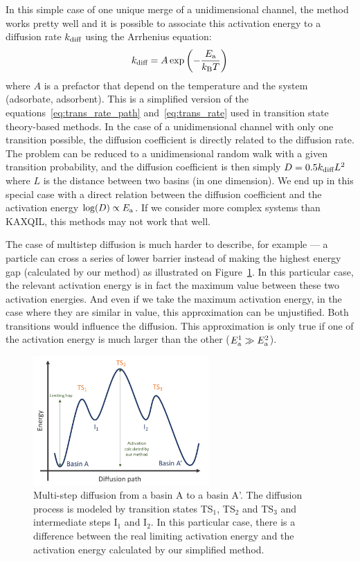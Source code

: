 \documentclass[main]{subfiles}
\begin{document}
In this simple case of one unique merge of a unidimensional channel, the method works pretty well and it is possible to associate this activation energy to a diffusion rate $k_{\text{diff}}$ using the Arrhenius equation:
\begin{equation}
  k_{\text{diff}} = A \exp\left(-\frac{E_{\text{a}}}{k_{\text{B}}T}\right)
\end{equation}
where $A$ is a prefactor that depend on the temperature and the system (adsorbate, adsorbent). This is a simplified version of the equations~\ref{eq:trans_rate_path} and~\ref{eq:trans_rate} used in transition state theory-based methods. In the case of a unidimensional channel with only one transition possible, the diffusion coefficient is directly related to the diffusion rate. The problem can be reduced to a unidimensional random walk with a given transition probability, and the diffusion coefficient is then simply $D=0.5k_{\text{diff}}L^2$ where $L$ is the distance between two basins (in one dimension). We end up in this special case with a direct relation between the diffusion coefficient and the activation energy $\log(D)\propto E_{\text{a}}$.
If we consider more complex systems than KAXQIL, this methods may not work that well. 

The case of multistep diffusion is much harder to describe, for example --- a particle can cross a series of lower barrier instead of making the highest energy gap (calculated by our method) as illustrated on Figure~\ref{fgr:TS_problem}. In this particular case, the relevant activation energy is in fact the maximum value between these two activation energies. And even if we take the maximum activation energy, in the case where they are similar in value, this approximation can be unjustified. Both transitions would influence the diffusion. This approximation is only true if one of the activation energy is much larger than the other ($E_{\text{a}}^1 \gg E_{\text{a}}^2$).

\begin{figure}[ht]
  \centering
    \includegraphics[width=0.6\textwidth]{figures/5-diffusion/Diffusion_TS.pdf}
    \caption{Multi-step diffusion from a basin A to a basin A'. The diffusion process is modeled by transition states TS$_1$, TS$_2$ and TS$_3$ and intermediate steps I$_1$ and I$_2$. In this particular case, there is a difference between the real limiting activation energy and the activation energy calculated by our simplified method. }\label{fgr:TS_problem}
\end{figure}
\end{document}
